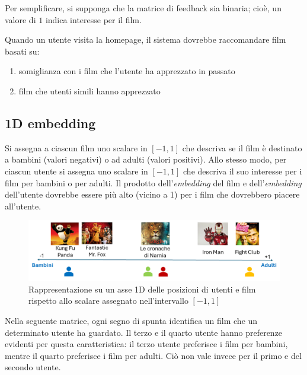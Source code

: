 Per semplificare, si supponga che la matrice di feedback sia binaria; cioè, un valore di $1$ indica interesse per il film.

Quando un utente visita la homepage, il sistema dovrebbe raccomandare film basati su:

\begin{enumerate}
    \item somiglianza con i film che l'utente ha apprezzato in passato
    \item film che utenti simili hanno apprezzato
\end{enumerate}

\subsection{1D embedding}

Si assegna a ciascun film uno scalare in $[-1, 1]$ che descriva se il film è destinato a bambini (valori negativi) o ad adulti (valori positivi). Allo stesso modo, per ciascun utente si assegna uno scalare in $[-1, 1]$ che descriva il suo interesse per i film per bambini o per adulti. Il prodotto dell'\textit{embedding} del film e dell'\textit{embedding} dell'utente dovrebbe essere più alto (vicino a 1) per i film che dovrebbero piacere all'utente.

\begin{figure}[H]
    \centering
    \includegraphics[scale=0.4]{figures/collaborative_filtering/embeddings.PNG}
    \caption{Rappresentazione su un asse 1D delle posizioni di utenti e film rispetto allo scalare assegnato nell'intervallo $[-1, 1]$}
    \label{fig:embeddings}
\end{figure}

Nella seguente matrice, ogni segno di spunta identifica un film che un determinato utente ha guardato. Il terzo e il quarto utente hanno preferenze evidenti per questa caratteristica: il terzo utente preferisce i film per bambini, mentre il quarto preferisce i film per adulti. Ciò non vale invece per il primo e del secondo utente.

